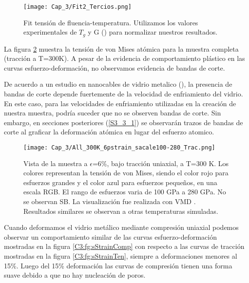 \begin{figure}[htp]
\centering
\texttt{[image: Cap\_3/Fit2\_Tercios.png]}
\caption[Fit tensión de fluencia-temperatura.]{Fit tensión de fluencia-temperatura. Utilizamos los valores experimentales de $T_g$ y G (\cite{johnson05}) para normalizar nuestros resultados.}
\label{C3:fg:fitDosTercios}
\end{figure}

La figura \ref{C3:fg:sampleTen} muestra la tensión de von Mises atómica para la muestra completa (tracción a T=300K). A pesar de la evidencia de comportamiento plástico en las curvas esfuerzo-deformación, no observamos evidencia de bandas de corte.


De acuerdo a un estudio en nanocables de vidrio metalico (\cite{xiao12}), la presencia de bandas de corte depende fuertemente de la velocidad de enfriamiento del vidrio. En este caso, para las velocidades de enfriamiento utilizadas en la creación de nuestra muestra, podría suceder que no se observen bandas de corte. Sin embargo, en secciones posteriores (\ref{S3_3_1}) se observarán trazos de bandas de corte al graficar la deformación atómica en lugar del esfuerzo atomico.


\begin{figure}[htp]
\centering
\texttt{[image: Cap\_3/All\_300K\_6pstrain\_sacale100-280\_Trac.png]}
\caption[Vista de la muestra a $\epsilon$=6\%, bajo tracción uniaxial, a T=300 K.]{Vista de la muestra a $\epsilon$=6\%, bajo tracción uniaxial, a T=300 K. Los colores representan la tensión de von Mises, siendo el color rojo para esfuerzos grandes y el color azul para esfuerzos pequeños, en una escala RGB. El rango de esfuerzos varia de 100 GPa a 280 GPa. No se observan SB. La visualización fue realizada con VMD \citep{humphrey96}. Resultados similares se observan a otras temperaturas simuladas.}
\label{C3:fg:sampleTen}
\end{figure}

Cuando deformamos el vidrio metálico mediante compresión uniaxial podemos observar un comportamiento similar de las curvas esfuerzo-deformación mostradas en la figura \ref{C3:fg:sStrainComp} con respecto a las curvas de tracción mostradas en la figura \ref{C3:fg:sStrainTen}, siempre a deformaciones menores al 15\%. Luego del 15\% deformación las curvas de compresión tienen una forma suave debido a que no hay nucleación de poros.

